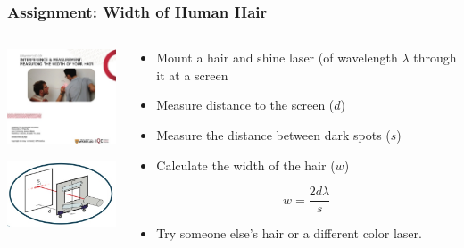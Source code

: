\documentclass{beamer}
\begin{document}
\begin{frame}\frametitle{Assignment: Width of Human Hair}
\begin{columns}
\begin{column}{4cm}
\begin{center}
\includegraphics[width=4cm]{fig/waterloo.jpg}

\vspace{.25cm}

\includegraphics[width=4cm]{fig/hair.jpg}
\end{center}
\end{column}
\begin{column}{7cm}
\begin{itemize}
\item Mount a hair and shine laser (of wavelength $\lambda$ through it at a screen
\item Measure distance to the screen ($d$)
\item Measure the distance between dark spots ($s$)
\item Calculate the width of the hair ($w$)

\[ w = \frac{2 d \lambda}{s} \]

\item Try someone else's hair or a different color laser.
\end{itemize}
\end{column}
\end{columns}
\end{frame}
\end{document}
